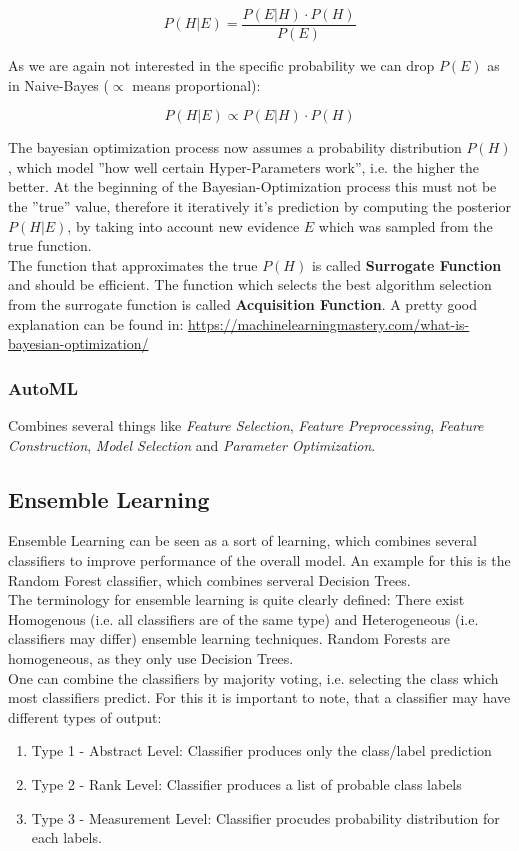\documentclass[12pt,a4paper]{article}
\begin{document}
\[P(H|E) = \frac{P(E|H) \cdot P(H)}{P(E)}\]

\noindent As we are again not interested in the specific probability we can drop \(P(E)\) as in Naive-Bayes (\(\propto\) means proportional):

\[P(H|E) \propto  P(E|H) \cdot P(H)\]

\noindent The bayesian optimization process now assumes a probability distribution \(P(H)\), which model ''how well certain Hyper-Parameters work'', i.e. the higher the better. At the beginning of the Bayesian-Optimization process this must not be the ''true'' value, therefore it iteratively it's prediction by computing the posterior \(P(H|E)\), by taking into account new evidence \(E\) which was sampled from the true function.\\
The function that approximates the true \(P(H)\) is called \textbf{Surrogate Function} and should be efficient. The function which selects the best algorithm selection from the surrogate function is called \textbf{Acquisition Function}.
A pretty good explanation can be found in: \url{https://machinelearningmastery.com/what-is-bayesian-optimization/}

\subsubsection{AutoML}

\noindent Combines several things like \textit{Feature Selection}, \textit{Feature Preprocessing}, \textit{Feature Construction}, \textit{Model Selection} and \textit{Parameter Optimization}.

\subsection{Ensemble Learning}

\noindent Ensemble Learning can be seen as a sort of learning, which combines several classifiers to improve performance of the overall model. An example for this is the Random Forest classifier, which combines serveral Decision Trees.\\
The terminology for ensemble learning is quite clearly defined: There exist Homogenous (i.e. all classifiers are of the same type) and Heterogeneous (i.e. classifiers may differ) ensemble learning techniques. Random Forests are homogeneous, as they only use Decision Trees.\\
One can combine the classifiers by majority voting, i.e. selecting the class which most classifiers predict. For this it is important to note, that a classifier may have different types of output:
\begin{enumerate}
    \item Type 1 - Abstract Level: Classifier produces only the class/label prediction
    \item Type 2 - Rank Level: Classifier produces a list of probable class labels 
    \item Type 3 - Measurement Level: Classifier procudes probability distribution for each labels.
\end{enumerate}
\end{document}
